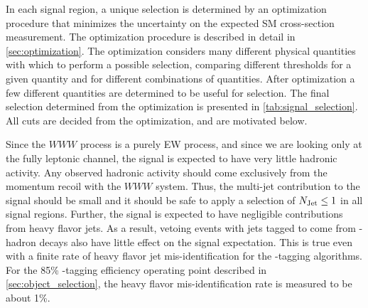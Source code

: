 In each signal region, a unique selection is determined by an optimization
procedure that minimizes the uncertainty on the expected SM cross-section
measurement. 
The optimization procedure is described in detail in \sec\ref{sec:optimization}.
The optimization considers many different physical quantities 
with which to perform a possible selection, comparing different
thresholds for a given quantity and for different combinations of 
quantities. After optimization a few different quantities
are determined to be useful for selection. 
The final selection determined from the optimization
is presented in \tab\ref{tab:signal_selection}.
All cuts are decided from the optimization, and are motivated below.






Since the $WWW$ process is a purely EW process, and since
we are looking only at the fully leptonic channel, the 
signal is expected to have very little hadronic 
activity. Any observed hadronic activity should come exclusively
from the momentum recoil with the $WWW$ system.
Thus, the multi-jet contribution to the signal
should be small and it should be safe to apply a selection of $N_{\textrm{Jet}} \leq 1$
in all signal regions.
Further, the signal is 
expected to have negligible contributions
from heavy flavor jets. As a result, vetoing events with jets
tagged to come from \bee-hadron decays also have
little effect on the signal expectation. This is true even with 
a finite rate of heavy flavor jet mis-identification for the 
\bee-tagging algorithms. For the 
85\% \bee-tagging efficiency operating point described in 
\sec\ref{sec:object_selection}, the heavy flavor
mis-identification rate is measured to be about 1\%. %


